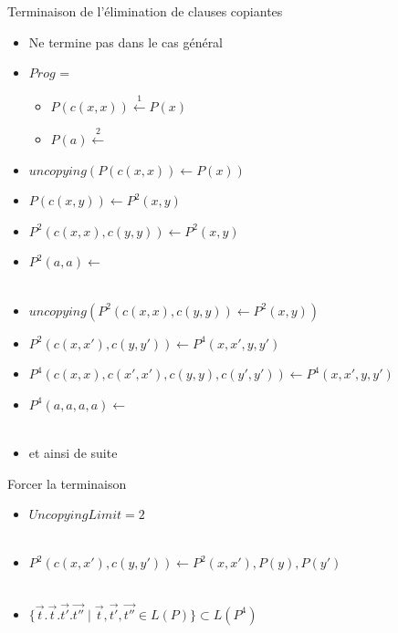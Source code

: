 \documentclass[xcolor={dvipsnames}]{beamer}
\begin{document}
\begin{frame}{Terminaison de l'élimination de clauses copiantes}
  \begin{itemize}[<+->]
  \item Ne termine pas dans le cas général
  \item $Prog$ =
    \begin{itemize}
    \item {}$P(c(x,x)) \stackrel{1}{\leftarrow} P(x)$
    \item {}$P(a) \stackrel{2}{\leftarrow} $
    \end{itemize}
    \vspace{\baselineskip}

  \item $uncopying(P(c(x,x)) \leftarrow P(x))$
  \item $P(c(x,y)) \leftarrow P^2(x, y)$
  \item {}$P^2(c(x,x),c(y,y)) \leftarrow P^2(x,y)$
  \item {}$P^2(a,a) \leftarrow $ \\~

  \item $uncopying(P^2(c(x,x), c(y,y)) \leftarrow P^2(x,y))$
  \item $P^2(c(x,x'), c(y,y')) \leftarrow P^4(x, x', y, y')$
  \item $P^4(c(x,x),c(x',x'),c(y,y),c(y',y')) \leftarrow P^4(x,x',y,y')$
  \item $P^4(a,a,a,a) \leftarrow $ \\~

  \item et ainsi de suite
  \end{itemize}
    
\end{frame}

\begin{frame}{Forcer la terminaison}
  \begin{itemize}[<+->]
  \item $UncopyingLimit = 2$ \\~

  \item $P^2(c(x,x'), c(y,y')) \leftarrow P^2(x, x'), P(y), P(y')$ \\~

  \item $\{ \vec{t}. \vec{t}. \vec{t'}. \vec{t''} \mid \vec{t},\vec{t'},\vec{t''} \in L(P) \} \subset L(P^4)$
  \end{itemize}
\end{frame}
\end{document}
